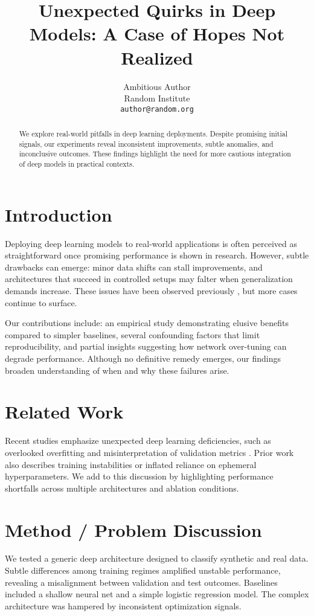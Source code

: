 \documentclass{iclr2025_conference}
\title{Unexpected Quirks in Deep Models: A Case of Hopes Not Realized}
\author{%
Ambitious Author \\
Random Institute \\
\texttt{author@random.org}
}
\begin{document}
\maketitle

\begin{abstract}
We explore real-world pitfalls in deep learning deployments. Despite promising initial signals, our experiments reveal inconsistent improvements, subtle anomalies, and inconclusive outcomes. These findings highlight the need for more cautious integration of deep models in practical contexts.
\end{abstract}

\section{Introduction}
Deploying deep learning models to real-world applications is often perceived as straightforward once promising performance is shown in research. However, subtle drawbacks can emerge: minor data shifts can stall improvements, and architectures that succeed in controlled setups may falter when generalization demands increase. These issues have been observed previously \citep{RefOne2019}, but more cases continue to surface.

Our contributions include: an empirical study demonstrating elusive benefits compared to simpler baselines, several confounding factors that limit reproducibility, and partial insights suggesting how network over-tuning can degrade performance. Although no definitive remedy emerges, our findings broaden understanding of when and why these failures arise.

\section{Related Work}
Recent studies emphasize unexpected deep learning deficiencies, such as overlooked overfitting and misinterpretation of validation metrics \citep{RefTwo2020}. Prior work also describes training instabilities or inflated reliance on ephemeral hyperparameters. We add to this discussion by highlighting performance shortfalls across multiple architectures and ablation conditions.

\section{Method / Problem Discussion}
We tested a generic deep architecture designed to classify synthetic and real data. Subtle differences among training regimes amplified unstable performance, revealing a misalignment between validation and test outcomes. Baselines included a shallow neural net and a simple logistic regression model. The complex architecture was hampered by inconsistent optimization signals.
\end{document}
